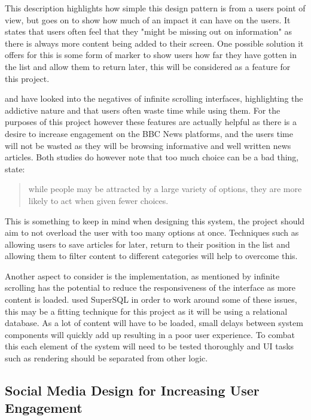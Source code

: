\documentclass[12pt,titlepage]{article}
\begin{document}
  This description highlights how simple this design pattern is from a users
  point of view, but goes on to show how much of an impact it can have on the
  users. It states that users often feel that they "might be missing out on
  information" \cite{newtarget} as there is always more content being added to
  their screen. One possible solution it offers for this is some form of marker
  to show users how far they have gotten in the list and allow them to return
  later, this will be considered as a feature for this project.

  \cite{neyman} and \cite{karlsson} have looked into the negatives of infinite
  scrolling interfaces, highlighting the addictive nature and that users often
  waste time while using them. For the purposes of this project however these
  features are actually helpful as there is a desire to increase engagement on
  the BBC News platforms, and the users time will not be wasted as they will be
  browsing informative and well written news articles. Both studies do however
  note that too much choice can be a bad thing, \cite{karlsson} state:

  \begin{quote}
    while people may be attracted by a large variety of options, they are more
    likely to act when given fewer choices.
  \end{quote}

  This is something to keep in mind when designing this system, the project
  should aim to not overload the user with too many options at once. Techniques
  such as allowing users to save articles for later, return to their position in
  the list and allowing them to filter content to different categories will help
  to overcome this.

  Another aspect to consider is the implementation, as mentioned by
  \cite{newtarget} infinite scrolling has the potential to reduce the
  responsiveness of the interface as more content is loaded. \cite{tajima} used
  SuperSQL in order to work around some of these issues, this may be a fitting
  technique for this project as it will be using a relational database. As a lot
  of content will have to be loaded, small delays between system components will
  quickly add up resulting in a poor user experience. To combat this each
  element of the system will need to be tested thoroughly and UI tasks such as
  rendering should be separated from other logic.

  \subsection{Social Media Design for Increasing User Engagement}
\end{document}
